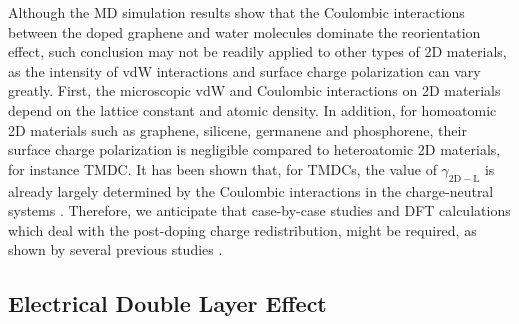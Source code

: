Although the MD simulation results show that the Coulombic
interactions between the doped graphene and water molecules dominate
the reorientation effect, such conclusion may not be readily applied
to other types of 2D materials, as the intensity of vdW interactions
and surface charge polarization can vary greatly. First, the
microscopic vdW and Coulombic interactions on 2D materials depend on
the lattice constant and atomic density. In addition, for homoatomic
2D materials such as graphene, silicene, germanene and phosphorene,
their surface charge polarization is negligible compared to
heteroatomic 2D materials, for instance TMDC. It has been shown that,
for TMDCs, the value of \(\gamma_{\mathrm{2D-L}}\) is already largely
determined by the Coulombic interactions in the charge-neutral systems
\autocite{Govind_Rajan_2016,Chow_2015_wetting_WS2}. Therefore, we anticipate that
case-by-case studies and DFT calculations which deal with the
post-doping charge redistribution, might be required, as shown by
several previous studies
\autocite{Sresht_2015,Govind_Rajan_2016,Sresht_2017_mos2-liquid}.


\subsection{Electrical Double Layer Effect}
\label{sec:org492fdee}

